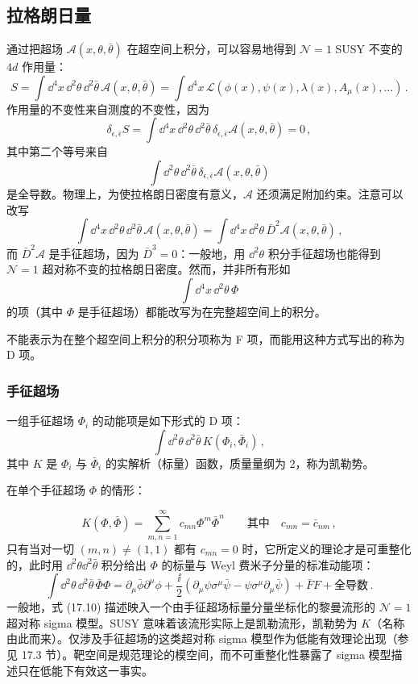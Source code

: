 \subsection{拉格朗日量}

通过把超场 $\mathcal{A}(x,\theta,\bar\theta)$ 在超空间上积分，可以容易地得到 $\mathcal{N}=1$ SUSY 不变的 $4d$ 作用量：
\[
S=\int \dd^4x\,\dd^2\theta\,\dd^2\bar\theta\,\mathcal{A}(x,\theta,\bar\theta)=\int \dd^4x\,\mathcal{L}(\phi(x),\psi(x),\lambda(x),A_\mu(x),\dots)\,.
\]
作用量的不变性来自测度的不变性，因为
\[
\delta_{\epsilon,\bar\epsilon}S=\int \dd^4x\,\dd^2\theta\,\dd^2\bar\theta\,\delta_{\epsilon,\bar\epsilon}\mathcal{A}(x,\theta,\bar\theta)=0\,,
\]
其中第二个等号来自
\[
\int \dd^2\theta\,\dd^2\bar\theta\,\delta_{\epsilon,\bar\epsilon}\mathcal{A}(x,\theta,\bar\theta)
\]
是全导数。物理上，为使拉格朗日密度有意义，$\mathcal{A}$ 还须满足附加约束。注意可以改写
\[
\int \dd^4x\,\dd^2\theta\,\dd^2\bar\theta\,\mathcal{A}(x,\theta,\bar\theta)=\int \dd^4x\,\dd^2\theta\,\bar D^2\mathcal{A}(x,\theta,\bar\theta)\,,
\]
而 $\bar D^2\mathcal{A}$ 是手征超场，因为 $\bar D^3=0$：一般地，用 $\dd^2\theta$ 积分手征超场也能得到 $\mathcal{N}=1$ 超对称不变的拉格朗日密度。然而，并非所有形如
\[
\int \dd^4x\,\dd^2\theta\,\Phi
\]
的项（其中 $\Phi$ 是手征超场）都能改写为在完整超空间上的积分。

\begin{definition}[17.20] 不能表示为在整个超空间上积分的积分项称为 F 项，而能用这种方式写出的称为 D 项。\end{definition}

\subsubsection*{手征超场}

\begin{definition}[17.21] 一组手征超场 $\Phi_i$ 的动能项是如下形式的 D 项：
\begin{equation}
\int \dd^2\theta\,\dd^2\bar\theta\,K(\Phi_i,\bar\Phi_i)\,,
\tag{17.10}
\end{equation}
其中 $K$ 是 $\Phi_i$ 与 $\bar\Phi_i$ 的实解析（标量）函数，质量量纲为 2，称为凯勒势。\end{definition}

在单个手征超场 $\Phi$ 的情形：

\[
K(\Phi,\bar\Phi)=\sum_{m,n=1}^{\infty}c_{mn}\Phi^m\bar\Phi^n\qquad\text{其中}\quad c_{mn}=\bar c_{nm}\,,
\]
只有当对一切 $(m,n)\ne(1,1)$ 都有 $c_{mn}=0$ 时，它所定义的理论才是可重整化的，此时用 $\dd^2\theta\dd^2\bar\theta$ 积分给出 $\Phi$ 的标量与 Weyl 费米子分量的标准动能项：
\[
\int \dd^2\theta\,\dd^2\bar\theta\,\bar\Phi\Phi=\partial_\mu\bar\phi\partial^\mu\phi+\frac{\ii}{2}\left(\partial_\mu\psi\sigma^\mu\bar\psi-\psi\sigma^\mu\partial_\mu\bar\psi\right)+\bar F F+\text{全导数}\,.
\]
一般地，式 (17.10) 描述映入一个由手征超场标量分量坐标化的黎曼流形的 $\mathcal{N}=1$ 超对称 sigma 模型。SUSY 意味着该流形实际上是凯勒流形，凯勒势为 $K$（名称由此而来）。仅涉及手征超场的这类超对称 sigma 模型作为低能有效理论出现（参见 17.3 节）。靶空间是规范理论的模空间，而不可重整化性暴露了 sigma 模型描述只在低能下有效这一事实。

